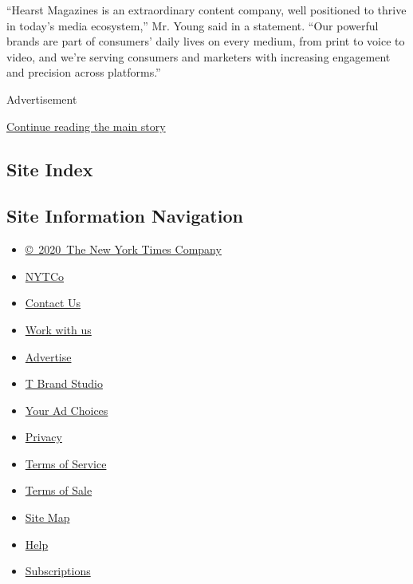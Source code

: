 ``Hearst Magazines is an extraordinary content company, well positioned
to thrive in today's media ecosystem,'' Mr. Young said in a statement.
``Our powerful brands are part of consumers' daily lives on every
medium, from print to voice to video, and we're serving consumers and
marketers with increasing engagement and precision across platforms.''

Advertisement

\protect\hyperlink{after-bottom}{Continue reading the main story}

\hypertarget{site-index}{%
\subsection{Site Index}\label{site-index}}

\hypertarget{site-information-navigation}{%
\subsection{Site Information
Navigation}\label{site-information-navigation}}

\begin{itemize}
\tightlist
\item
  \href{https://help.nytimes3xbfgragh.onion/hc/en-us/articles/115014792127-Copyright-notice}{©~2020~The
  New York Times Company}
\end{itemize}

\begin{itemize}
\tightlist
\item
  \href{https://www.nytco.com/}{NYTCo}
\item
  \href{https://help.nytimes3xbfgragh.onion/hc/en-us/articles/115015385887-Contact-Us}{Contact
  Us}
\item
  \href{https://www.nytco.com/careers/}{Work with us}
\item
  \href{https://nytmediakit.com/}{Advertise}
\item
  \href{http://www.tbrandstudio.com/}{T Brand Studio}
\item
  \href{https://www.nytimes3xbfgragh.onion/privacy/cookie-policy\#how-do-i-manage-trackers}{Your
  Ad Choices}
\item
  \href{https://www.nytimes3xbfgragh.onion/privacy}{Privacy}
\item
  \href{https://help.nytimes3xbfgragh.onion/hc/en-us/articles/115014893428-Terms-of-service}{Terms
  of Service}
\item
  \href{https://help.nytimes3xbfgragh.onion/hc/en-us/articles/115014893968-Terms-of-sale}{Terms
  of Sale}
\item
  \href{https://spiderbites.nytimes3xbfgragh.onion}{Site Map}
\item
  \href{https://help.nytimes3xbfgragh.onion/hc/en-us}{Help}
\item
  \href{https://www.nytimes3xbfgragh.onion/subscription?campaignId=37WXW}{Subscriptions}
\end{itemize}
